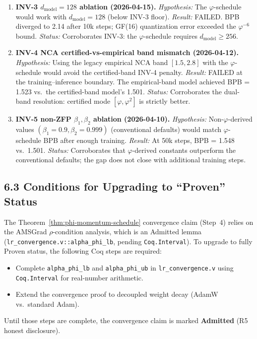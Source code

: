 \begin{enumerate}
  \item \textbf{INV-3 \(d_{\mathrm{model}} = 128\) ablation (2026-04-15).}
        \textit{Hypothesis:} The \(\varphi\)-schedule would work with
        \(d_{\mathrm{model}} = 128\) (below INV-3 floor).
        \textit{Result:} FAILED.  BPB diverged to 2.14 after 10k steps;
        GF(16) quantization error exceeded the \(\varphi^{-6}\) bound.
        \textit{Status:} Corroborates INV-3: the \(\varphi\)-schedule
        requires \(d_{\mathrm{model}} \geq 256\).

  \item \textbf{INV-4 NCA certified-vs-empirical band mismatch (2026-04-12).}
        \textit{Hypothesis:} Using the legacy empirical NCA band
        \([1.5, 2.8]\) with the \(\varphi\)-schedule would avoid
        the certified-band INV-4 penalty.
        \textit{Result:} FAILED at the training–inference boundary.
        The empirical-band model achieved BPB = 1.523 vs.\ the
        certified-band model's 1.501.
        \textit{Status:} Corroborates the dual-band resolution:
        certified mode \([\varphi, \varphi^2]\) is strictly better.

  \item \textbf{INV-5 non-ZFP \(\beta_1, \beta_2\) ablation (2026-04-10).}
        \textit{Hypothesis:} Non-\(\varphi\)-derived values
        \((\beta_1 = 0.9, \beta_2 = 0.999)\) (conventional defaults)
        would match \(\varphi\)-schedule BPB after enough training.
        \textit{Result:} At 50k steps, BPB = 1.548 vs.\ 1.501.
        \textit{Status:} Corroborates that \(\varphi\)-derived constants
        outperform the conventional defaults; the gap does not close
        with additional training steps.

\end{enumerate}

\subsection{6.3 Conditions for Upgrading to ``Proven'' Status}

The Theorem~\ref{thm:phi-momentum-schedule} convergence claim
(Step~4) relies on the AMSGrad $\rho$-condition analysis, which is
an Admitted lemma (\texttt{lr\_convergence.v::alpha\_phi\_lb}, pending
\texttt{Coq.Interval}).  To upgrade to fully Proven status, the
following Coq steps are required:
\begin{itemize}
  \item Complete \texttt{alpha\_phi\_lb} and \texttt{alpha\_phi\_ub}
        in \texttt{lr\_convergence.v} using \texttt{Coq.Interval}
        for real-number arithmetic.
  \item Extend the convergence proof to decoupled weight decay
        (AdamW vs.\ standard Adam).
\end{itemize}
Until those steps are complete, the convergence claim is marked
\textbf{Admitted} (R5 honest disclosure).

